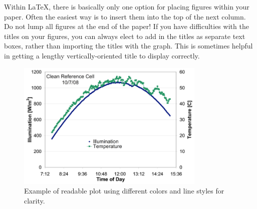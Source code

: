 \documentclass[conference]{./pvsctran}
\begin{document}
Within \LaTeX, there is basically only one option for placing figures
within your paper.  Often the easiest way is to insert them into the
top of the next column.
Do not lump all figures at the end of the paper!
If you have difficulties with the titles on your figures, you can always elect to add in the titles as separate text boxes, rather than importing the titles with the graph. This is sometimes helpful in getting a lengthy vertically-oriented title to display correctly.


\begin{figure}
\centering
\includegraphics[width=9cm]{image1.png}
\caption{Example of readable plot using different colors and line styles for clarity.}
\end{figure}
\end{document}
